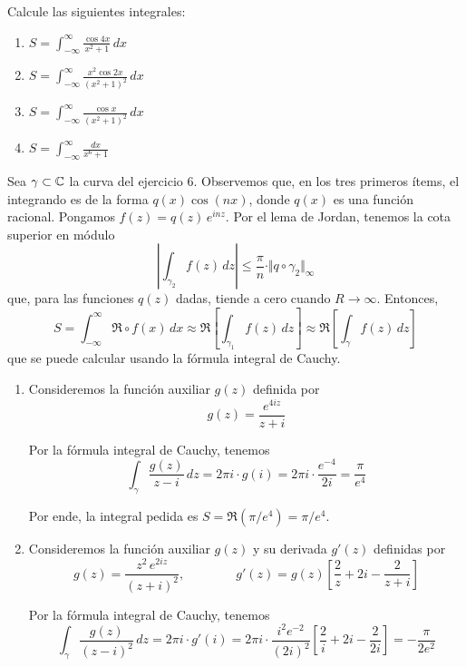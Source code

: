\begin{exercise}
Calcule las siguientes integrales:
\begin{enumerate}[label=(\alph*)]
    \item $\displaystyle S = \int_{-\infty}^\infty \frac {\cos 4x} {x^2 + 1} \, dx$
    \item $\displaystyle S = \int_{-\infty}^\infty \frac {x^2 \cos 2x} {(x^2 + 1)^2} \, dx$
    \item $\displaystyle S = \int_{-\infty}^\infty \frac {\cos x} {(x^2 + 1)^2} \, dx$
    \item $\displaystyle S = \int_{-\infty}^\infty \frac {dx} {x^6 + 1}$
\end{enumerate}
\end{exercise}

\begin{solution}
Sea $\gamma \subset \mathbb C$ la curva del ejercicio 6. Observemos que, en los tres primeros ítems, el integrando es de la forma $q(x) \cos(nx)$, donde $q(x)$ es una función racional. Pongamos $f(z) = q(z) \, e^{inz}$. Por el lema de Jordan, tenemos la cota superior en módulo
$$\left| \int_{\gamma_2} f(z) \, dz \right| \le \frac \pi n \cdot \Vert q \circ \gamma_2 \Vert_\infty$$
que, para las funciones $q(z)$ dadas, tiende a cero cuando $R \to \infty$. Entonces,
$$
S
    = \int_{-\infty}^\infty \Re \circ f(x) \, dx
    \approx \Re \left[ \int_{\gamma_1} f(z) \, dz \right]
    \approx \Re \left[ \int_\gamma f(z) \, dz \right]
$$
que se puede calcular usando la fórmula integral de Cauchy.
\begin{enumerate}[label=(\alph*)]
    \item Consideremos la función auxiliar $g(z)$ definida por
    $$g(z) = \frac {e^{4iz}} {z + i}$$
    
    Por la fórmula integral de Cauchy, tenemos
    $$
    \int_\gamma \frac {g(z)} {z - i} \, dz
        = 2\pi i \cdot g(i)
        = 2\pi i \cdot \frac {e^{-4}} {2i}
        = \frac \pi {e^4}
    $$
    
    Por ende, la integral pedida es $S = \Re(\pi/e^4) = \pi/e^4$.
    
    \item Consideremos la función auxiliar $g(z)$ y su derivada $g'(z)$ definidas por
    $$
    g(z) = \frac {z^2 \, e^{2iz}} {(z + i)^2}, \qquad \qquad
    g'(z) = g(z) \left[ \frac 2z + 2i - \frac 2 {z + i} \right]
    $$
    
    Por la fórmula integral de Cauchy, tenemos
    $$
    \int_\gamma \frac {g(z)} {(z - i)^2} \, dz
        = 2\pi i \cdot g'(i)
        = 2\pi i \cdot \frac {i^2 e^{-2}} {(2i)^2} \left[ \frac 2i + 2i - \frac 2 {2i} \right]
        = -\frac \pi {2e^2}
    $$
    

\end{enumerate}
\end{solution}
